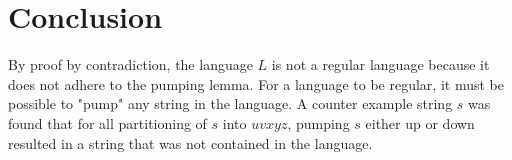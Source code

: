 \documentclass{assignment-x}
\begin{document}
\section{Conclusion}
By proof by contradiction, the language $L$ is not a regular language because it does not adhere to the pumping lemma. For a language to be regular, it must be possible to "pump" any string in the language. A counter example string $s$ was found that for all partitioning of $s$ into $uvxyz$, pumping $s$ either up or down resulted in a string that was not contained in the language.
\end{document}
